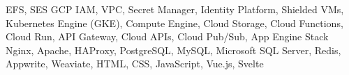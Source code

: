\begin{cvskills}
{          EFS,
          SES
        }
    \cvskill
        { GCP }
        {
          IAM,
          VPC,
          Secret Manager,
          Identity Platform,
          Shielded VMs,
          Kubernetes Engine (GKE),
          Compute Engine,
          Cloud Storage,
          Cloud Functions,
          Cloud Run,
          API Gateway,
          Cloud APIs,
          Cloud Pub/Sub,
          App Engine
        }
    \cvskill
        { Stack }
        {
          Nginx,
          Apache,
          HAProxy,
          PostgreSQL,
          MySQL,
          Microsoft SQL Server,
          Redis,
          Appwrite,
          Weaviate,
          HTML,
          CSS,
          JavaScript,
          Vue.js,
          Svelte
        }

\end{cvskills}
